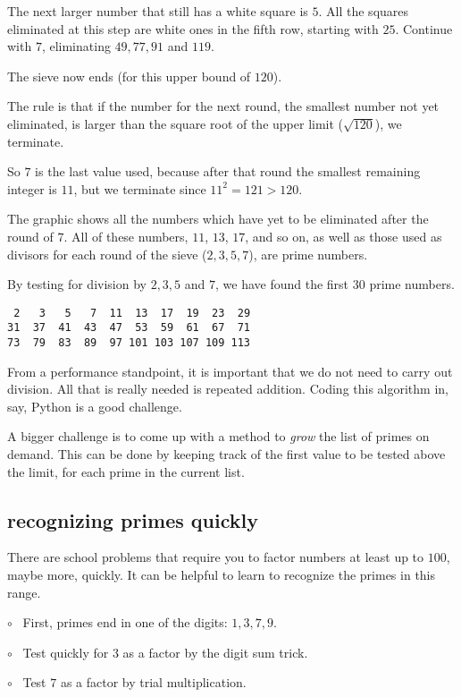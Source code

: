 \documentclass[11pt, oneside]{article}
\begin{document}
The next larger number that still has a white square is $5$.  All the squares eliminated at this step are white ones in the fifth row, starting with $25$.  Continue with $7$, eliminating $49, 77, 91$ and $119$.

The sieve now ends (for this upper bound of $120$).  

The rule is that if the number for the next round, the smallest number not yet eliminated, is larger than the square root of the upper limit ($\sqrt{120}$), we terminate.  

So $7$ is the last value used, because after that round the smallest remaining integer is $11$, but we terminate since $11^2 = 121 > 120$.

The graphic shows all the numbers which have yet to be eliminated after the round of $7$.   All of these numbers, $11$, $13$, $17$, and so on, as well as those used as divisors for each round of the sieve ($2, 3, 5, 7$), are prime numbers.

By testing for division by $2, 3, 5$ and $7$, we have found the first $30$ prime numbers.

\begin{verbatim}
 2   3   5   7  11  13  17  19  23  29
31  37  41  43  47  53  59  61  67  71 
73  79  83  89  97 101 103 107 109 113
\end{verbatim}

From a performance standpoint, it is important that we do not need to carry out division.  All that is really needed is repeated addition.  Coding this algorithm in, say, Python is a good challenge.  

A bigger challenge is to come up with a method to \emph{grow} the list of primes on demand.  This can be done by keeping track of the first value to be tested above the limit, for each prime in the current list.

\subsection*{recognizing primes quickly}

There are school problems that require you to factor numbers at least up to $100$, maybe more, quickly.  It can be helpful to learn to recognize the primes in this range.

$\circ$ \ First, primes end in one of the digits: $1,3,7,9$.

$\circ$ \ Test quickly for $3$ as a factor by the digit sum trick.

$\circ$ \ Test $7$ as a factor by trial multiplication.
\end{document}
